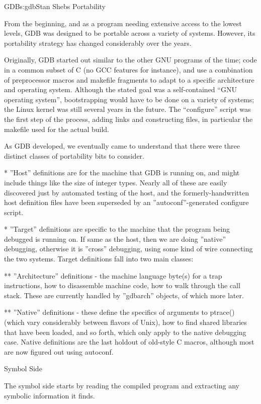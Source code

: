 \begin{aosachapter}{GDB}{s:gdb}{Stan Shebs}
Portability

From the beginning, and as a program needing extensive access to the
lowest levels, GDB was designed to be portable across a variety of
systems.  However, its portability strategy has changed considerably
over the years.

Originally, GDB started out similar to the other GNU programs of the
time; code in a common subset of C (no GCC features for instance), and
use a combination of preprocessor macros and makefile fragments to
adapt to a specific architecture and operating system.  Although the
stated goal was a self-contained ``GNU operating system'',
bootstrapping would have to be done on a variety of systems; the Linux
kernel was still several years in the future.  The ``configure'' script
was the first step of the process, adding links and constructing files,
in particular the makefile used for the actual build.

As GDB developed, we eventually came to understand that there were three
distinct classes of portability bits to consider.

* ''Host'' definitions are for the machine that GDB is running on, and
might include things like the size of integer types.  Nearly all of these
are easily discovered just by automated testing of the host, and the
formerly-handwritten host definition files have been superseded by
an ''autoconf''-generated configure script.

* ''Target'' definitions are specific to the machine that the program
being debugged is running on.  If same as the host, then we are doing
''native'' debugging, otherwise it is ''cross'' debugging, using some
kind of wire connecting the two systems.  Target definitions fall into
two main classes:

** ''Architecture'' definitions - the machine language byte(s) for a
trap instructions, how to disassemble machine code, how to walk
through the call stack.  These are currently handled by ''gdbarch''
objects, of which more later.

** ''Native'' definitions - these define the specifics of arguments to
ptrace() (which vary considerably between flavors of Unix), how to
find shared libraries that have been loaded, and so forth, which only
apply to the native debugging case.  Native definitions are the last
holdout of old-style C macros, although most are now figured out using
autoconf.

Symbol Side

The symbol side starts by reading the compiled program and extracting
any symbolic information it finds.


\end{aosachapter}

